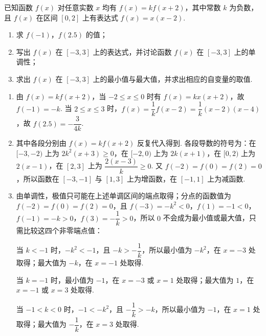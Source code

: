 \begin{problem}
已知函数 \(f(x)\) 对任意实数 \(x\) 均有 \(f(x) = kf(x + 2)\)，其中常数 \(k\) 为负数，且 \(f(x)\) 在区间 \([0, 2]\) 上有表达式 \(f(x) = x(x - 2)\).

\begin{enumerate}
\item 求 \(f(-1)\)，\(f(2.5)\) 的值；
\item 写出 \(f(x)\) 在 \([-3, 3]\) 上的表达式，并讨论函数 \(f(x)\) 在 \([-3, 3]\) 上的单调性；
\item 求出 \(f(x)\) 在 \([-3, 3]\) 上的最小值与最大值，并求出相应的自变量的取值.
\end{enumerate}
\end{problem}

\begin{solution}
\begin{enumerate}
\item 由 \(f(x)=kf(x+2)\)，当 \(-2\le x\le0\) 时有 \(f(x)=kx(x+2)\)，故 \(f(-1)=-k\). 当 \(2\le x\le3\) 时，\(f(x)=\dfrac1k f(x-2)=\dfrac1k(x-2)(x-4)\)，故 \(f(2.5)=-\dfrac{3}{4k}\).
\item
{}
其中各段分别由 \(f(x)=k f(x+2)\) 反复代入得到. 各段导数的符号为：在 \([-3,-2)\) 上为 \(2k^2(x+3)\ge0\)，在 \([-2,0)\) 上为 \(2k(x+1)\)，在 \([0,2)\) 上为 \(2(x-1)\)，在 \([2,3]\) 上为 \(\dfrac{2(x-3)}k\ge0\). 又 \(f(-2)=f(0)=f(2)=0\)，所以函数在 \([-3,-1]\) 与 \([1,3]\) 上为增函数，在 \([-1,1]\) 上为减函数.
\item
由单调性，极值只可能在上述单调区间的端点取得；分点的函数值为 \(f(-2)=f(0)=f(2)=0\)，且 \(f(-3)=-k^2<0\)，\(f(1)=-1<0\)，\(f(-1)=-k>0\)，\(f(3)=-\dfrac1k>0\)，所以 \(0\) 不会成为最小值或最大值，只需比较这四个非零端点值：

当 \(k<-1\) 时，\(-k^2<-1\)，且 \(-k>-\dfrac1k\)，所以最小值为 \(-k^2\)，在 \(x=-3\) 处取得；最大值为 \(-k\)，在 \(x=-1\) 处取得.

当 \(k=-1\) 时，最小值为 \(-1\)，在 \(x=-3\) 或 \(x=1\) 处取得；最大值为 \(1\)，在 \(x=-1\) 或 \(x=3\) 处取得.

当 \(-1<k<0\) 时，\(-1<-k^2\)，且 \(-\dfrac1k>-k\)，所以最小值为 \(-1\)，在 \(x=1\) 处取得；最大值为 \(-\dfrac1k\)，在 \(x=3\) 处取得.
\end{enumerate}
\end{solution}

